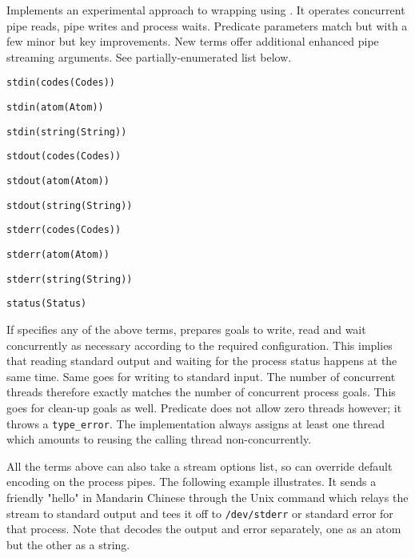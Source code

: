 \begin{description}
Implements an experimental approach to wrapping 
using . It operates concurrent pipe reads, pipe writes
and process waits. Predicate parameters match  but
with a few minor but key improvements. New  terms offer
additional enhanced pipe streaming arguments. See
partially-enumerated list below.

\begin{shortlist}
    \item \verb$stdin(codes(Codes))$
    \item \verb$stdin(atom(Atom))$
    \item \verb$stdin(string(String))$
    \item \verb$stdout(codes(Codes))$
    \item \verb$stdout(atom(Atom))$
    \item \verb$stdout(string(String))$
    \item \verb$stderr(codes(Codes))$
    \item \verb$stderr(atom(Atom))$
    \item \verb$stderr(string(String))$
    \item \verb$status(Status)$
\end{shortlist}

If  specifies any of the above terms,  prepares goals to
write, read and wait concurrently as necessary according to the
required configuration. This implies that reading standard output
and waiting for the process status happens at the same time. Same
goes for writing to standard input. The number of concurrent threads
therefore exactly matches the number of concurrent process goals.
This goes for clean-up goals as well. Predicate  does
not allow zero threads however; it throws a \verb$type_error$. The
implementation always assigns at least one thread which amounts to
reusing the calling thread non-concurrently.

All the  terms above can also take a stream options list, so
can override default encoding on the process pipes. The following
example illustrates. It sends a friendly "hello" in Mandarin Chinese
through the Unix  command which relays the stream to standard
output and tees it off to \verb$/dev/stderr$ or standard error for that
process. Note that  decodes the output and error separately,
one as an atom but the other as a string.


\end{description}

